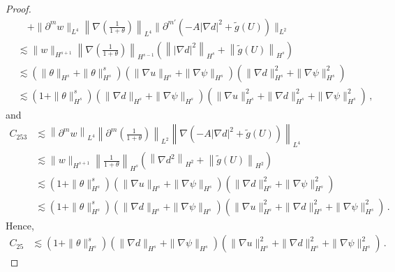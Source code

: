 \documentclass[reqno,11pt]{amsart}
\numberwithin{equation}{section}
\begin{document}
\begin{proof}
\begin{equation*}
\begin{aligned}
&\quad + \| \partial^m w \|_{L^4} \left\| \nabla \left(\frac{1}{1+\theta}\right) \right\|_{L^4} \| \partial^{m'} (-A | \nabla d |^2 + \tilde{g}(U)) \|_{L^2}\\&
\lesssim \| w \|_{H^{s+1}} \left\| \nabla \left( \frac{1}{1+\theta} \right) \right\|_{H^{s-1}} \left( \left\| |\nabla d|^2 \right\|_{H^s} + \left\| \tilde{g}(U) \right\|_{H^s} \right) \\&
\lesssim \left( \| \theta \|_{H^s} + \| \theta \|_{H^s}^s \right) \left( \| \nabla u \|_{H^s} + \| \nabla \psi \|_{H^s} \right) \left( \| \nabla d \|_{H^s}^2 + \| \nabla \psi \|_{H^s}^2 \right) \\&
\lesssim (1+\| \theta \|_{H^s}^s) \left( \| \nabla d \|_{H^s} + \| \nabla \psi \|_{H^s} \right) \left( \| \nabla u \|_{H^s}^2 + \| \nabla d \|_{H^s}^2 + \| \nabla \psi \|_{H^s}^2 \right) \,,
\end{aligned}
\end{equation*}
and
\begin{equation*}
\begin{aligned}
C_{253}&\lesssim \left\| \partial^m w \right\|_{L^4} \left\| \partial^m \left( \frac{1}{1+\theta} \right) \right\|_{L^2} \left\| \nabla \left( -A |\nabla d|^2 + \tilde{g}(U) \right) \right\|_{L^4} \\&
\lesssim \| w \|_{H^{s+1}} \left\| \frac{1}{1+\theta} \right\|_{H^s} \left( \left\| \nabla d^2 \right\|_{H^2} + \left\| \tilde{g}(U) \right\|_{H^2} \right) \\&
\lesssim (1+\| \theta \|_{H^s}^s) \left( \| \nabla u \|_{H^s} + \| \nabla \psi \|_{H^s} \right) \left( \| \nabla d \|_{H^s}^2 + \| \nabla \psi \|_{H^s}^2 \right) \\&
\lesssim (1+\| \theta \|_{H^s}^s) \left( \| \nabla d \|_{H^s} + \| \nabla \psi \|_{H^s} \right) \left( \| \nabla u \|_{H^s}^2 + \| \nabla d \|_{H^s}^2 + \| \nabla \psi \|_{H^s}^2 \right) \,.
\end{aligned}
\end{equation*}
Hence,
\begin{equation}\label{gpsi-eq19}
\begin{aligned}
C_{25}&\lesssim (1+\| \theta \|_{H^s}^s) \left( \| \nabla d \|_{H^s} + \| \nabla \psi \|_{H^s} \right) \left( \| \nabla u \|_{H^s}^2 + \| \nabla d \|_{H^s}^2 + \| \nabla \psi \|_{H^s}^2 \right) \,.
\end{aligned}
\end{equation}


\end{proof}
\end{document}
